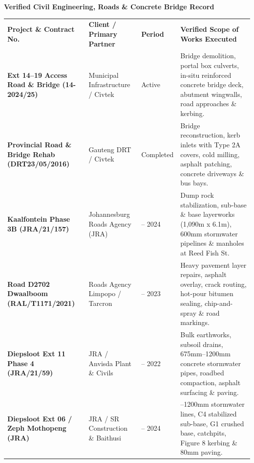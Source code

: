\documentclass[a4paper,11pt]{article}
\begin{document}
\vfill

{\large\bfseries\color{mhnavy} Verified Civil Engineering, Roads \& Concrete Bridge Record}
\vspace{0.10cm}

\renewcommand{\arraystretch}{1.22}
\begin{tabularx}{\textwidth}{@{}p{3.8cm} p{3.2cm} p{1.8cm} X@{}}
\rowcolor{mhnavy}
{\color{white}\bfseries\fontsize{8pt}{9.8pt}\selectfont Project \& Contract No.} &
{\color{white}\bfseries\fontsize{8pt}{9.8pt}\selectfont Client / Primary Partner} &
{\color{white}\bfseries\fontsize{8pt}{9.8pt}\selectfont Period} &
{\color{white}\bfseries\fontsize{8pt}{9.8pt}\selectfont Verified Scope of Works Executed} \\
\rowcolor{mhbluelight}
\fontsize{7.5pt}{9.2pt}\selectfont\bfseries Ext 14--19 Access Road \& Bridge (14-2024/25) & \fontsize{7.5pt}{9.2pt}\selectfont Municipal Infrastructure / Civtek & \fontsize{7.5pt}{9.2pt}\selectfont Active & \fontsize{7.5pt}{9.2pt}\selectfont Bridge demolition, portal box culverts, in-situ reinforced concrete bridge deck, abutment wingwalls, road approaches \& kerbing. \\
\fontsize{7.5pt}{9.2pt}\selectfont\bfseries Provincial Road \& Bridge Rehab (DRT23/05/2016) & \fontsize{7.5pt}{9.2pt}\selectfont Gauteng DRT / Civtek & \fontsize{7.5pt}{9.2pt}\selectfont Completed & \fontsize{7.5pt}{9.2pt}\selectfont Bridge reconstruction, kerb inlets with Type 2A covers, cold milling, asphalt patching, concrete driveways \& bus bays. \\
\rowcolor{mhbluelight}
\fontsize{7.5pt}{9.2pt}\selectfont\bfseries Kaalfontein Phase 3B (JRA/21/157) & \fontsize{7.5pt}{9.2pt}\selectfont Johannesburg Roads Agency (JRA) & \fontsize{7.5pt}{9.2pt}\selectfont 2023 -- 2024 & \fontsize{7.5pt}{9.2pt}\selectfont Dump rock stabilization, sub-base \& base layerworks (1,090m x 6.1m), 600mm stormwater pipelines \& manholes at Reed Fish St. \\
\fontsize{7.5pt}{9.2pt}\selectfont\bfseries Road D2702 Dwaalboom (RAL/T1171/2021) & \fontsize{7.5pt}{9.2pt}\selectfont Roads Agency Limpopo / Tarcron & \fontsize{7.5pt}{9.2pt}\selectfont 2021 -- 2023 & \fontsize{7.5pt}{9.2pt}\selectfont Heavy pavement layer repairs, asphalt overlay, crack routing, hot-pour bitumen sealing, chip-and-spray \& road markings. \\
\rowcolor{mhbluelight}
\fontsize{7.5pt}{9.2pt}\selectfont\bfseries Diepsloot Ext 11 Phase 4 (JRA/21/59) & \fontsize{7.5pt}{9.2pt}\selectfont JRA / Anvisda Plant \& Civils & \fontsize{7.5pt}{9.2pt}\selectfont 2021 -- 2022 & \fontsize{7.5pt}{9.2pt}\selectfont Bulk earthworks, subsoil drains, 675mm--1200mm concrete stormwater pipes, roadbed compaction, asphalt surfacing \& paving. \\
\fontsize{7.5pt}{9.2pt}\selectfont\bfseries Diepsloot Ext 06 / Zeph Mothopeng (JRA) & \fontsize{7.5pt}{9.2pt}\selectfont JRA / SR Construction \& Baithusi & \fontsize{7.5pt}{9.2pt}\selectfont 2019 -- 2024 & \fontsize{7.5pt}{9.2pt}\selectfont 450mm--1200mm stormwater lines, C4 stabilized sub-base, G1 crushed base, catchpits, Figure 8 kerbing \& 80mm paving. \\
\end{tabularx}
\renewcommand{\arraystretch}{1}
\end{document}
